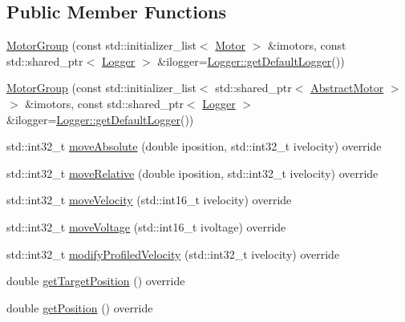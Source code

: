 \subsection*{Public Member Functions}
\begin{DoxyCompactItemize}
\item 
\mbox{\hyperlink{classokapi_1_1MotorGroup_a6bc96434556403fecf7e715faa6359f9}{Motor\+Group}} (const std\+::initializer\+\_\+list$<$ \mbox{\hyperlink{classokapi_1_1Motor}{Motor}} $>$ \&imotors, const std\+::shared\+\_\+ptr$<$ \mbox{\hyperlink{classokapi_1_1Logger}{Logger}} $>$ \&ilogger=\mbox{\hyperlink{classokapi_1_1Logger_a5053cf778b4b55acba788a3797dc96d2}{Logger\+::get\+Default\+Logger}}())
\item 
\mbox{\hyperlink{classokapi_1_1MotorGroup_a7b0d2c64bb1c78c117160b8dfeb07611}{Motor\+Group}} (const std\+::initializer\+\_\+list$<$ std\+::shared\+\_\+ptr$<$ \mbox{\hyperlink{classokapi_1_1AbstractMotor}{Abstract\+Motor}} $>$$>$ \&imotors, const std\+::shared\+\_\+ptr$<$ \mbox{\hyperlink{classokapi_1_1Logger}{Logger}} $>$ \&ilogger=\mbox{\hyperlink{classokapi_1_1Logger_a5053cf778b4b55acba788a3797dc96d2}{Logger\+::get\+Default\+Logger}}())
\item 
std\+::int32\+\_\+t \mbox{\hyperlink{classokapi_1_1MotorGroup_afe6800639a995d37d8963c72fb8526d4}{move\+Absolute}} (double iposition, std\+::int32\+\_\+t ivelocity) override
\item 
std\+::int32\+\_\+t \mbox{\hyperlink{classokapi_1_1MotorGroup_a4295103133b5cb721dfb457a8cc8c2bc}{move\+Relative}} (double iposition, std\+::int32\+\_\+t ivelocity) override
\item 
std\+::int32\+\_\+t \mbox{\hyperlink{classokapi_1_1MotorGroup_a9f31c14e92efe7ab492b2c335c51b488}{move\+Velocity}} (std\+::int16\+\_\+t ivelocity) override
\item 
std\+::int32\+\_\+t \mbox{\hyperlink{classokapi_1_1MotorGroup_acebebe160f2c733ee497b1b8b50b0781}{move\+Voltage}} (std\+::int16\+\_\+t ivoltage) override
\item 
std\+::int32\+\_\+t \mbox{\hyperlink{classokapi_1_1MotorGroup_a616f20db24f1eff4d3641b86faef4fbd}{modify\+Profiled\+Velocity}} (std\+::int32\+\_\+t ivelocity) override
\item 
double \mbox{\hyperlink{classokapi_1_1MotorGroup_ad6332111f8b2642bc13fbd8822328121}{get\+Target\+Position}} () override
\item 
double \mbox{\hyperlink{classokapi_1_1MotorGroup_a6bf3c5a2f5caf0e5b02e8dcf2e8130d9}{get\+Position}} () override
\item 
$$
\end{DoxyCompactItemize}
